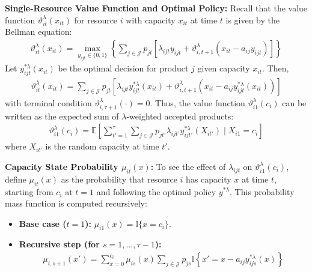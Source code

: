 \documentclass[11pt]{article}
\begin{document}
\noindent
\textbf{Single-Resource Value Function and Optimal Policy:}
Recall that the value function $\vartheta^\lambda_{it}(x_{it})$ for resource $i$ with capacity $x_{it}$ at time $t$ is given by the Bellman equation:
\begin{align*}
\vartheta^\lambda_{it}(x_{it}) = \max_{y_{ijt} \in \{0,1\}} \left\{ \sum_{j \in \mathcal{J}} p_{jt} \left[ \lambda_{ijt} y_{ijt} + \vartheta^\lambda_{i, t+1}(x_{it} - a_{ij} y_{ijt}) \right] \right\}
\end{align*}
Let $y^{*\lambda}_{ijt}(x_{it})$ be the optimal decision for product $j$ given capacity $x_{it}$. Then,
\begin{align*}
\vartheta^\lambda_{it}(x_{it}) = \sum_{j \in \mathcal{J}} p_{jt} \left[ \lambda_{ijt} y^{*\lambda}_{ijt}(x_{it}) + \vartheta^\lambda_{i, t+1}(x_{it} - a_{ij} y^{*\lambda}_{ijt}(x_{it})) \right]
\end{align*}
with terminal condition $\vartheta^\lambda_{i, \tau+1}(\cdot) = 0$.
Thus, the value function $\vartheta^\lambda_{i1}(c_i)$ can be written as the expected sum of $\lambda$-weighted accepted products:
\begin{align*}
\vartheta^\lambda_{i1}(c_i) = \mathbb{E} \left[ \sum_{t'=1}^{\tau} \sum_{j \in \mathcal{J}} p_{jt'} \lambda_{ijt'} y^{*\lambda}_{ijt'}(X_{it'}) \mid X_{i1} = c_i \right]
\end{align*}
where $X_{it'}$ is the random capacity at time $t'$.

\vspace{0.5cm}

\noindent
\textbf{Capacity State Probability $\mu_{it}(x)$:}
To see the effect of $\lambda_{ijt}$ on $\vartheta^\lambda_{i1}(c_i)$, define $\mu_{it}(x)$ as the probability that resource $i$ has capacity $x$ at time $t$, starting from $c_i$ at $t=1$ and following the optimal policy $y^{*\lambda}$. This probability mass function is computed recursively:
\begin{itemize}
    \item \textbf{Base case ($t=1$):} $\mu_{i1}(x) = \mathbb{I}\{x = c_i\}$.
    \item \textbf{Recursive step (for $s=1, \ldots, \tau-1$):}
    \begin{align*}
    \mu_{i,s+1}(x') = \sum_{x=0}^{c_{i}} \mu_{is}(x) \sum_{j \in \mathcal{J}} p_{js} \mathbb{I}\left\{x' = x - a_{ij}y^{*\lambda}_{ijs}(x)\right\}
    \end{align*}
\end{itemize}

\vspace{0.5cm}
\end{document}
